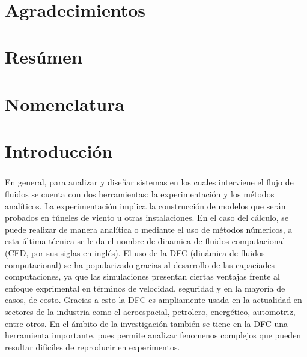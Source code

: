 \documentclass[letterpaper, openright, 12pt]{book}
\begin{document}
	\newpage
	\begin{flushright}
		\textit{}
	\end{flushright}
	\ %

	\chapter*{Agradecimientos}

	\chapter*{Resúmen}

	\tableofcontents
	
	\cleardoublepage
	\listoffigures


	\cleardoublepage
	\listoftables
	\cleardoublepage

	\chapter*{Nomenclatura}

	\chapter*{Introducción}
	\paragraph*{}
    En general, para analizar y diseñar sistemas en los cuales interviene el
    flujo de fluidos se cuenta con dos herramientas: la experimentación y los
    métodos analíticos. La experimentación implica la construcción de modelos
    que serán probados en túneles de viento u otras instalaciones. En el caso
    del cálculo, se puede realizar de manera analítica o mediante el uso de métodos númericos,
    a esta última técnica se le da el nombre de dinamica de fluidos
    computacional (CFD, por sus siglas en inglés). El uso de la DFC (dinámica
    de fluidos computacional) se ha popularizado gracias al desarrollo de las
    capaciades computaciones, ya que las simulaciones presentan ciertas
    ventajas frente al enfoque exprimental en términos de velocidad, seguridad
    y en la mayoría de casos, de costo. Gracias a esto la DFC es ampliamente
    usada en la actualidad en sectores de la industria como el aeroespacial,
    petrolero, energético, automotriz, entre otros. En el ámbito de la investigación también se tiene
    en la DFC una herramienta importante, pues permite analizar fenomenos
    complejos que pueden resultar dificiles de reproducir en experimentos.
\end{document}
